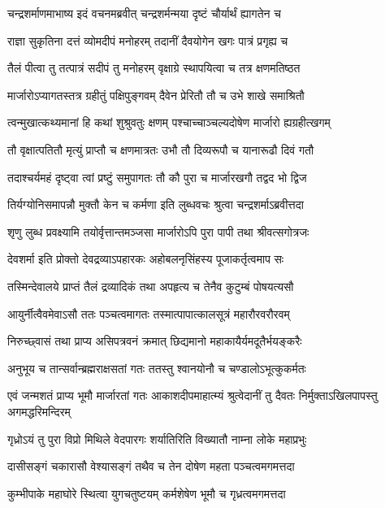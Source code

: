 \twolineshloka
{चन्द्रशर्माणमाभाष्य इदं वचनमब्रवीत्}
{चन्द्रशर्मन्मया दृष्टं चौर्यार्थं ह्यागतेन च} %

\twolineshloka
{राज्ञा सुकृतिना दत्तं व्योमदीपं मनोहरम्}
{तदानीं दैवयोगेन खगः पात्रं प्रगृह्य च} %

\twolineshloka
{तैलं पीत्वा तु तत्पात्रं सदीपं तु मनोहरम्}
{वृक्षाग्रे स्थापयित्वा च तत्र क्षणमतिष्ठत} %

\twolineshloka
{मार्जारोऽप्यागतस्तत्र ग्रहीतुं पक्षिपुङ्गवम्}
{दैवेन प्रेरितौ तौ च उभे शाखे समाश्रितौ} %

\twolineshloka
{त्वन्मुखात्कथ्यमानां हि कथां शुश्रुवतुः क्षणम्}
{पश्चाच्चाञ्चल्यदोषेण मार्जारो ह्यग्रहीत्खगम्} %

\twolineshloka
{तौ वृक्षात्पतितौ मृत्युं प्राप्तौ च क्षणमात्रतः}
{उभौ तौ दिव्यरूपौ च यानारूढौ दिवं गतौ} %

\twolineshloka
{तदाश्चर्यमहं दृष्ट्वा त्वां प्रष्टुं समुपागतः}
{तौ कौ पुरा च मार्जारखगौ तद्वद भो द्विज} %

\twolineshloka
{तिर्यग्योनिसमापन्नौ मुक्तौ केन च कर्मणा}
{इति लुब्धवचः श्रुत्वा चन्द्रशर्माऽब्रवीत्तदा} %

\twolineshloka
{शृणु लुब्ध प्रवक्ष्यामि तयोर्वृत्तान्तमञ्जसा}
{मार्जारोऽपि पुरा पापी तथा श्रीवत्सगोत्रजः} %

\twolineshloka
{देवशर्मा इति प्रोक्तो देवद्रव्याऽपहारकः}
{अहोबलनृसिंहस्य पूजाकर्तृत्वमाप सः} %

\twolineshloka
{तस्मिन्देवालये प्राप्तं तैलं द्रव्यादिकं तथा}
{अपहृत्य च तेनैव कुटुम्बं पोषयत्यसौ} %

\twolineshloka
{आयुर्नीत्वैवमेवाऽसौ ततः पञ्चत्वमागतः}
{तस्मात्पापात्कालसूत्रं महारौरवरौरवम्} %

\twolineshloka
{निरुच्छ्वासं तथा प्राप्य असिपत्रवनं क्रमात्}
{छिद्यमानो महाकायैर्यमदूतैर्भयङ्करैः} %

\twolineshloka
{अनुभूय च तान्सर्वान्ब्रह्मराक्षसतां गतः}
{ततस्तु श्वानयोनौ च चण्डालोऽभूत्कुकर्मतः} %

\threelineshloka
{एवं जन्मशतं प्राप्य भूमौ मार्जारतां गतः}
{आकाशदीपमाहात्म्यं श्रुत्वेदानीं तु दैवतः}
{निर्मुक्ताऽखिलपापस्तु अगमद्धरिमन्दिरम्} %

\twolineshloka
{गृध्रोऽयं तु पुरा विप्रो मिथिले वेदपारगः}
{शर्यातिरिति विख्यातौ नाम्ना लोके महाप्रभुः} %

\twolineshloka
{दासीसङ्गं चकारासौ वेश्यासङ्गं तथैव च}
{तेन दोषेण महता पञ्चत्वमगमत्तदा} %

\twolineshloka
{कुम्भीपाके महाघोरे स्थित्वा युगचतुष्टयम्}
{कर्मशेषेण भूमौ च गृध्रत्वमगमत्तदा} %


